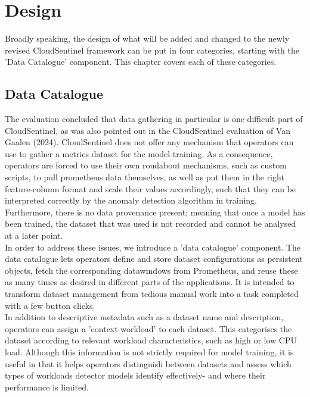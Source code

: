 \section{Design}
Broadly speaking, the design of what will be added and changed to the newly revised CloudSentinel framework can be put in four categories, starting with the 'Data Catalogue' component. This chapter covers each of these categories.

\subsection{Data Catalogue}
The evaluation concluded that data gathering in particular is one difficult part of CloudSentinel, as was also pointed out in the CloudSentinel evaluation of Van Gaalen (2024). CloudSentinel does not offer any mechanism that operators can use to gather a metrics dataset for the model-training. As a consequence, operators are forced to use their own roudabout mechanisms, such as custom scripts, to pull prometheus data  themselves, as well as put them in the right feature-column format and scale their values accordingly, such that they can be interpreted correctly by the anomaly detection algorithm in training. Furthermore, there is no data provenance present; meaning that once a model has been trained, the dataset that was used is not recorded and cannot be analysed at a later point.\\

In order to address these issues, we introduce a 'data catalogue' component. The data catalogue lets operators define and store dataset configurations as persistent objects, fetch the corresponding datawindows from Prometheus, and reuse these as many times as desired in different parts of the applications. It is intended to transform dataset management from tedious manual work into a task completed with a few button clicks.\\

In addition to descriptive metadata such as a dataset name and description, operators can assign a 'context workload' to each dataset. This categorises the dataset according to relevant workload characteristics, such as high or low CPU load. Although this information is not strictly required for model training, it is useful in that it helps operators distinguish between datasets and assess which types of workloads detector models identify effectively- and where their performance is limited.\\

